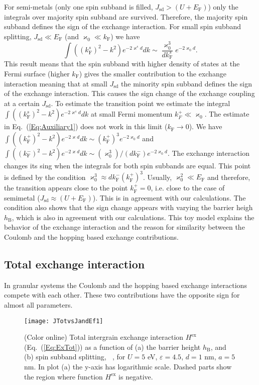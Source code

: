 \documentclass[aps,prb,amsmath,amssymb,twocolumn,superscriptaddress,showpacs,floatfix]{revtex4-1}
\DeclareMathOperator{\Ji}{\mathit J_{\mathrm{sd}}}
\begin{document}
For semi-metals (only one spin subband is
filled, $J_\mathrm{sd}>(U+E_\mathrm F)$) only the integrals over majority spin subband are survived.
Therefore, the majority spin subband defines the sign of the exchange interaction.
For small spin subband splitting, $J_\mathrm{sd}\ll E_\mathrm F$ (and $\varkappa_0\ll k_\mathrm F$)
we have
\begin{equation}\label{Eq:Auxiliary1}
\int ((k^s_\mathrm F)^2-k^2)e^{-2\varkappa^s d}dk\sim\frac{\varkappa_0^3}{dk^s_\mathrm F}e^{-2\varkappa_0 d}.
\end{equation}
This result means that the spin subband with
higher density of states at the Fermi surface (higher $k_\mathrm F$)
gives the smaller contribution to the exchange interaction meaning
that at small $J_\mathrm{sd}$ the minority spin subband defines
the sign of the exchange interaction. This causes the sign change of the
exchange coupling at a certain $J_\mathrm{sd}$.
To estimate the transition point we estimate the
integral $\int ((k^s_\mathrm F)^2-k^2)e^{-2\varkappa^s d}dk$ at small Fermi
momentum $k_F^+\ll \varkappa_0$. The estimate in Eq.~(\ref{Eq:Auxiliary1}) does
not work in this limit ($k_\mathrm F\to 0$). We have $\int ((k^+_\mathrm F)^2-k^2)e^{-2\varkappa d}dk\sim (k^+_\mathrm F)^3e^{-2\varkappa_0d}$ and $\int ((k^-_\mathrm F)^2-k^2)e^{-2\varkappa d}dk\sim(\varkappa_0^3)/(dk^-_\mathrm F)e^{-2\varkappa_0 d}$. The exchange interaction changes its sing when the integrals for both spin subbands
are equal. This point is defined by the condition $\varkappa_0^3\approx d k^-_\mathrm F (k^+_\mathrm F)^3$.
Usually, $\varkappa_0^2\ll E_\mathrm F$ and therefore, the transition appears
close to the point $k^+_\mathrm F=0$, i.e. close to the case of
semimetal ($J_\mathrm{sd}\approx(U+E_\mathrm F)$). This is in agreement
with our calculations. The condition also shows that the sign change
appears with varying the barrier heigh $h_\mathrm B$, which
is also in agreement with our calculations. This toy model explains the
behavior of the exchange interaction and the reason for
similarity between the Coulomb and the hopping based exchange contributions.



\subsection{Total exchange interaction}


In granular systems the Coulomb and the
hopping based exchange interactions compete with each other. These two contributions
have the opposite sign for almost all parameters.
\begin{figure}
\texttt{[image: JTotvsJandEf1]}
\caption{(Color online) Total intergrain exchange interaction $H^\mathrm{ex}$ (Eq.~(\ref{Eq:ExTot})) as a function of
(a) the barrier height $h_\mathrm B$, and (b) spin subband splitting, $\Ji$, for $U=5$ eV, $\varepsilon=4.5$, $d=1$ nm, $a=5$ nm. In plot (a) the y-axis has logarithmic scale. Dashed parts show the region where function
$H^\mathrm{ex}$ is negative.} \label{Fig:JTotvsJandEf1}
\end{figure}
\end{document}
